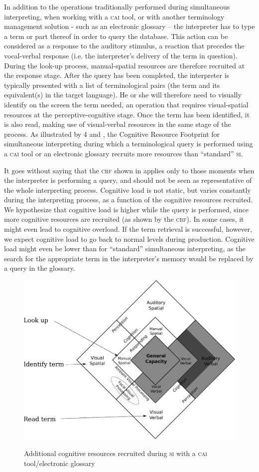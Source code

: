 \documentclass[output=paper]{langsci/langscibook}
\begin{document}
In addition to the operations traditionally performed during simultaneous interpreting, when working with a \textsc{cai} tool, or with another terminology management solution - such as an electronic glossary – the interpreter has to type a term or part thereof in order to query the database. This action can be considered as a response to the auditory stimulus, a reaction that precedes the vocal-verbal response (i.e. the interpreter’s delivery of the term in question). During the look-up process, manual-spatial resources are therefore recruited at the response stage. After the query has been completed, the interpreter is typically presented with a list of terminological pairs (the term and its equivalent(s) in the target language). He or she will therefore need to visually identify on the screen the term needed, an operation that requires visual-spatial resources at the perceptive-cognitive stage. Once the term has been identified, it is also read, making use of visual-verbal resources in the same stage of the process. As illustrated by 4 and , the Cognitive Resource Footprint for simultaneous interpreting during which a terminological query is performed using a \textsc{cai} tool or an electronic glossary recruits more resources than ``standard'' \textsc{si}. 

It goes without saying that the \textsc{crf} shown in  applies only to those moments when the interpreter is performing a query, and should not be seen as representative of the whole interpreting process. Cognitive load is not static, but varies constantly during the interpreting process, as a function of the cognitive resources recruited. We hypothesize that cognitive load is higher while the query is performed, since more cognitive resources are recruited (as shown by the \textsc{crf}). In some cases, it might even lead to cognitive overload. If the term retrieval is successful, however, we expect cognitive load to go back to normal levels during production. Cognitive load might even be lower than for ``standard'' simultaneous interpreting, as the search for the appropriate term in the interpreter’s memory would be replaced by a query in the glossary.

\begin{figure}
        \includegraphics[width=.7\textwidth]{figures/fig2-4.pdf}
\label{fig:prandi:4}\caption{Additional cognitive resources recruited during \textsc{si} with a \textsc{cai} tool/electronic glossary}
\end{figure}
\end{document}
